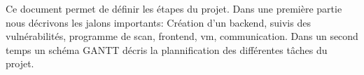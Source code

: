 Ce document permet de définir les étapes du projet. Dans une première partie nous décrivons les jalons importants: Création d'un backend, suivis des vulnérabilités, programme de scan, frontend, vm, communication. Dans un second temps un schéma GANTT décris la plannification des différentes tâches du projet.